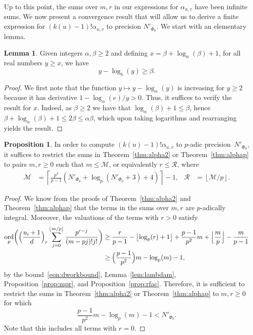 \documentclass[a4paper,11pt]{article}
\numberwithin{equation}{section}
\providecommand{\floor}[1]{\left\lfloor#1\right\rfloor}   %
\providecommand{\floorBig}[1]{\Bigl\lfloor#1\Bigr\rfloor} %
\providecommand{\ceil}[1]{\left\lceil#1\right\rceil}   %
\DeclareMathOperator{\ord}{ord}          %
\theoremstyle{definition}
\newtheorem{lem}[thm]{Lemma}
\newtheorem{prop}[thm]{Proposition}
\begin{document}
Up to this point, the sums over $m,r$ in our expressions 
for $\alpha_{u,v}$ have been infinite sums.  We now present 
a convergence result that will allow us to derive a finite 
expression for $(k(u)-1)!\alpha_{u,v}$ to precision $N'_{\Phi_0}$.
We start with an elementary lemma.

\begin{lem} \label{lem:log}
Given integers $\alpha, \beta \geq 2$ and defining 
$x = \beta + \log_{\alpha}(\beta) + 1$, 
for all real numbers $y \geq x$,
we have 
\begin{equation*}
y - \log_b(y) \geq \beta.
\end{equation*}
\end{lem}

\begin{proof}
We first note that the function $y \mapsto y - \log_{\alpha}(y)$ is increasing 
for $y \geq 2$ because it has derivative $1 - \log_{\alpha}(e)/y > 0$.  Thus, 
it suffices to verify the result for $x$.  Indeed, as $\beta \geq 2$ we have 
that $\log_{\alpha}(\beta) + 1 \leq \beta$, hence 
$\beta + \log_{\alpha}(\beta) + 1 \leq 2 \beta \leq \alpha \beta$,
which upon taking logarithms and rearranging yields the result.
\end{proof}


\begin{prop} \label{prop:MR}
In order to compute $(k(u)-1)!\alpha_{u,v}$ to $p$-adic precision~$N'_{\Phi_0}$, 
it suffices to restrict the sums in Theorem~\ref{thm:alpha2} or 
Theorem~\ref{thm:alphap} to pairs $m,r \geq 0$ such that $m \leq \mathcal{M}$, 
or equivalently $r \leq \mathcal{R}$, where 
\begin{align*}
\mathcal{M} &= \ceil{\frac{p^2}{p-1}(N'_{\Phi_0}+\log_p(N'_{\Phi_0}+3)+4)} - 1,
&\mathcal{R} &= \floor{\mathcal{M}/p}.
\end{align*}
\end{prop}

\begin{proof}
We know from the proofs of Theorem~\ref{thm:alpha2} and 
Theorem~\ref{thm:alphap} that the terms in the sums over $m,r$ are 
$p$-adically integral. Moreover, the valuations of the terms with 
$r > 0$ satisfy
\begin{align*}
\ord_p \biggl( \Bigl( \frac{u_i+1}{d} \Bigr)_r 
               \sum_{j=0}^{\floor{m/p}} \frac{p^{r-j}}{(m-pj)!j!} \biggr) 
&\geq \frac{r}{p-1} - \floor{\log_p(r)+1} 
      + \frac{p-1}{p^2} m + \floorBig{\frac{m}{p}} - \frac{m}{p-1} \\
&\geq \Bigl( \frac{p-1}{p^2} \Bigr) m - \log_p(m) - 1,
\end{align*}
by the bound~\eqref{eqn:dworkbound}, Lemma~\ref{lem:lambdam}, 
Proposition~\ref{prop:mpr}, and Proposition~\ref{prop:rfac}. 
Therefore, it is sufficient to restrict the sums in Theorem~\ref{thm:alpha2} 
or Theorem~\ref{thm:alphap} to $m,r \geq 0$ for which 
\begin{equation*}
\frac{p-1}{p^2} m - \log_p(m) - 1 < N'_{\Phi_0}.
\end{equation*}
Note that this includes all terms with $r = 0$.
\end{proof}
\end{document}
